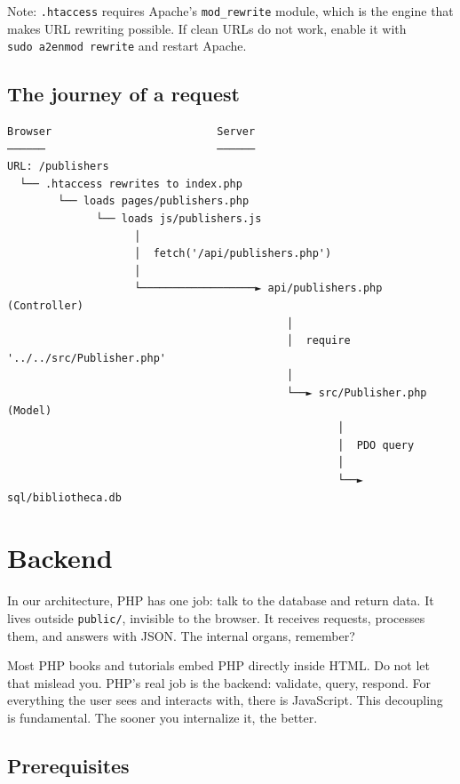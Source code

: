\documentclass[11pt,a4paper,oneside]{book}
\begin{document}
Note: \texttt{.htaccess} requires Apache's \texttt{mod\_rewrite}
module, which is the engine that makes URL rewriting possible. If
clean URLs do not work, enable it with
\texttt{sudo\ a2enmod\ rewrite} and restart Apache.

\hypertarget{the-journey-of-a-request}{%
\section{The journey of a
request}\label{the-journey-of-a-request}}

\begin{verbatim}
Browser                          Server
──────                           ──────
URL: /publishers
  └── .htaccess rewrites to index.php
        └── loads pages/publishers.php
              └── loads js/publishers.js
                    │
                    │  fetch('/api/publishers.php')
                    │
                    └──────────────────► api/publishers.php (Controller)
                                            │
                                            │  require '../../src/Publisher.php'
                                            │
                                            └──► src/Publisher.php (Model)
                                                    │
                                                    │  PDO query
                                                    │
                                                    └──► sql/bibliotheca.db
\end{verbatim}

\newpage

\hypertarget{backend}{%
\chapter{Backend}\label{backend}}

In our architecture, PHP has one job: talk to the database and
return data. It lives outside \texttt{public/}, invisible to the
browser. It receives requests, processes them, and answers with
JSON. The internal organs, remember?

Most PHP books and tutorials embed PHP directly inside HTML. Do
not let that mislead you. PHP's real job is the backend:
validate, query, respond. For everything the user sees and
interacts with, there is JavaScript. This decoupling is
fundamental. The sooner you internalize it, the better.

\hypertarget{prerequisites}{%
\section{Prerequisites}\label{prerequisites}}
\end{document}
